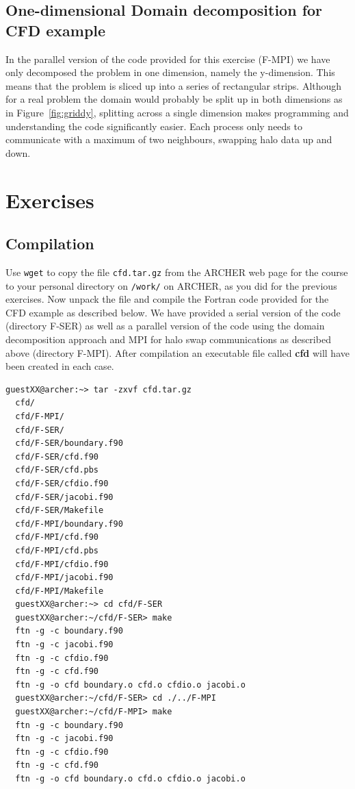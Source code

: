 \documentclass{article}
\begin{document}
\subsection{One-dimensional Domain decomposition for CFD example}

In the parallel version of the code provided for this exercise (F-MPI)
we have only decomposed the problem in one dimension, namely the
y-dimension. This means that the problem is sliced up into a series of
rectangular strips. Although for a real problem the domain would
probably be split up in both dimensions as in Figure~\ref{fig:griddy},
splitting across a single dimension makes programming and
understanding the code significantly easier. Each process only needs
to communicate with a maximum of two neighbours, swapping halo data up
and down.

\newpage

\section{Exercises}

\subsection{Compilation}

Use \verb+wget+ to copy the file \verb+cfd.tar.gz+ from the ARCHER web
page for the course to your personal directory on \verb+/work/+ on
ARCHER, as you did for the previous exercises. Now unpack the file and
compile the Fortran code provided for the CFD example as described
below. We have provided a serial version of the code (directory F-SER)
as well as a parallel version of the code using the domain
decomposition approach and MPI for halo swap communications as
described above (directory F-MPI). After compilation an executable
file called \textbf{cfd} will have been created in each case.

\begin{lstlisting}[frame=single]
  guestXX@archer:~> tar -zxvf cfd.tar.gz 
  cfd/
  cfd/F-MPI/
  cfd/F-SER/
  cfd/F-SER/boundary.f90
  cfd/F-SER/cfd.f90
  cfd/F-SER/cfd.pbs
  cfd/F-SER/cfdio.f90
  cfd/F-SER/jacobi.f90
  cfd/F-SER/Makefile
  cfd/F-MPI/boundary.f90
  cfd/F-MPI/cfd.f90
  cfd/F-MPI/cfd.pbs
  cfd/F-MPI/cfdio.f90
  cfd/F-MPI/jacobi.f90
  cfd/F-MPI/Makefile
  guestXX@archer:~> cd cfd/F-SER
  guestXX@archer:~/cfd/F-SER> make
  ftn -g -c boundary.f90
  ftn -g -c jacobi.f90
  ftn -g -c cfdio.f90
  ftn -g -c cfd.f90
  ftn -g -o cfd boundary.o cfd.o cfdio.o jacobi.o 
  guestXX@archer:~/cfd/F-SER> cd ./../F-MPI
  guestXX@archer:~/cfd/F-MPI> make
  ftn -g -c boundary.f90
  ftn -g -c jacobi.f90
  ftn -g -c cfdio.f90
  ftn -g -c cfd.f90
  ftn -g -o cfd boundary.o cfd.o cfdio.o jacobi.o 
\end{lstlisting}
\end{document}
